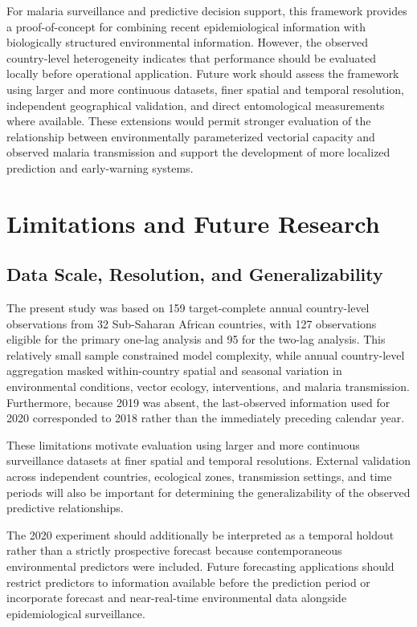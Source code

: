 \documentclass[10pt,twocolumn]{article}
\begin{document}
For malaria surveillance and predictive decision support, this
framework provides a proof-of-concept for combining recent
epidemiological information with biologically structured environmental
information. However, the observed country-level heterogeneity
indicates that performance should be evaluated locally before
operational application. Future work should assess the framework using
larger and more continuous datasets, finer spatial and temporal
resolution, independent geographical validation, and direct
entomological measurements where available. These extensions would
permit stronger evaluation of the relationship between environmentally
parameterized vectorial capacity and observed malaria transmission and
support the development of more localized prediction and early-warning
systems.



\section{Limitations and Future Research}

\subsection{Data Scale, Resolution, and Generalizability}

The present study was based on 159 target-complete annual
country-level observations from 32 Sub-Saharan African countries, with
127 observations eligible for the primary one-lag analysis and 95 for
the two-lag analysis. This relatively small sample constrained model
complexity, while annual country-level aggregation masked
within-country spatial and seasonal variation in environmental
conditions, vector ecology, interventions, and malaria transmission.
Furthermore, because 2019 was absent, the last-observed information
used for 2020 corresponded to 2018 rather than the immediately
preceding calendar year.

These limitations motivate evaluation using larger and more continuous
surveillance datasets at finer spatial and temporal resolutions.
External validation across independent countries, ecological zones,
transmission settings, and time periods will also be important for
determining the generalizability of the observed predictive
relationships.

The 2020 experiment should additionally be interpreted as a temporal
holdout rather than a strictly prospective forecast because
contemporaneous environmental predictors were included. Future
forecasting applications should restrict predictors to information
available before the prediction period or incorporate forecast and
near-real-time environmental data alongside epidemiological
surveillance.
\end{document}
